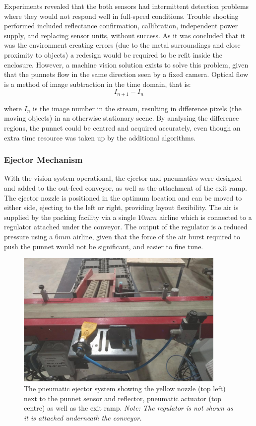 \documentclass[fleqn,twoside]{article}
\begin{document}
Experiments revealed that the both sensors had intermittent detection problems where they would not respond well in full-speed conditions. Trouble shooting performed included reflectance confirmation, callibration, independent power supply, and replacing sensor units, without success. As it was concluded that it was the environment creating errors (due to the metal surroundings and close proximity to objects) a redesign would be required to be refit inside the enclosure. However, a machine vision solution exists to solve this problem, given that the punnets flow in the same direction seen by a fixed camera. Optical flow is a method of image subtraction in the time domain, that is:
\begin{equation}
	I_{n+1} - I_n
\end{equation}

where $I_n$ is the image number in the stream, resulting in difference pixels (the moving objects) in an otherwise stationary scene. By analysing the difference regions, the punnet could be centred and acquired accurately, even though an extra time resource was taken up by the additional algorithms. 

\subsubsection{Ejector Mechanism}

With the vision system operational, the ejector and pneumatics were designed and added to the out-feed conveyor, as well as the attachment of the exit ramp. The ejector nozzle is positioned in the optimum location and can be moved to either side, ejecting to the left or right, providing layout flexibility. The air is supplied by the packing facility via a single $10mm$ airline which is connected to a regulator attached under the conveyor. The output of the regulator is a reduced pressure using a $6mm$ airline, given that the force of the air burst required to push the punnet would not be significant, and easier to fine tune.


\begin{figure}[h]
	\centering
	\includegraphics[width=0.9\textwidth]{ejector.jpg}
	\caption{The pneumatic ejector system showing the yellow nozzle (top left) next to the punnet sensor and reflector, pneumatic actuator (top centre) as well as the exit ramp. \textit{Note: The regulator is not shown as it is attached underneath the conveyor.}}
	\label{fig:ejector}
\end{figure}
\end{document}
